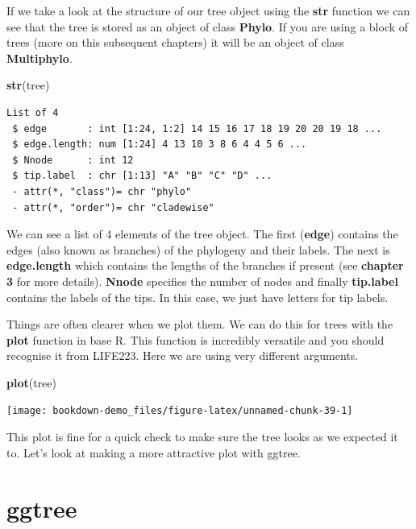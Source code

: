 \documentclass[
]{book}
\newenvironment{Shaded}{\begin{snugshade}}{\end{snugshade}}
\newcommand{\KeywordTok}[1]{\textcolor[rgb]{0.13,0.29,0.53}{\textbf{#1}}}
\newcommand{\NormalTok}[1]{#1}
\begin{document}
If we take a look at the structure of our tree object using the \textbf{str} function we can see that the tree is stored as an object of class \textbf{Phylo}. If you are using a block of trees (more on this subsequent chapters) it will be an object of class \textbf{Multiphylo}.

\begin{Shaded}
\begin{Highlighting}[]
\KeywordTok{str}\NormalTok{(tree)}
\end{Highlighting}
\end{Shaded}

\begin{verbatim}
List of 4
 $ edge       : int [1:24, 1:2] 14 15 16 17 18 19 20 20 19 18 ...
 $ edge.length: num [1:24] 4 13 10 3 8 6 4 4 5 6 ...
 $ Nnode      : int 12
 $ tip.label  : chr [1:13] "A" "B" "C" "D" ...
 - attr(*, "class")= chr "phylo"
 - attr(*, "order")= chr "cladewise"
\end{verbatim}

We can see a list of 4 elements of the tree object. The first (\textbf{edge}) contains the edges (also known as branches) of the phylogeny and their labels. The next is \textbf{edge.length} which contains the lengths of the branches if present (see \textbf{chapter 3} for more details). \textbf{Nnode} specifies the number of nodes and finally \textbf{tip.label} contains the labels of the tips. In this case, we just have letters for tip labels.

Things are often clearer when we plot them. We can do this for trees with the \textbf{plot} function in base R. This function is incredibly versatile and you should recognise it from LIFE223. Here we are using very different arguments.

\begin{Shaded}
\begin{Highlighting}[]
\KeywordTok{plot}\NormalTok{(tree)}
\end{Highlighting}
\end{Shaded}

\begin{center}\texttt{[image: bookdown-demo\_files/figure-latex/unnamed-chunk-39-1]} \end{center}

This plot is fine for a quick check to make sure the tree looks as we expected it to. Let's look at making a more attractive plot with ggtree.

\hypertarget{ggtree}{%
\section{ggtree}\label{ggtree}}
\end{document}
